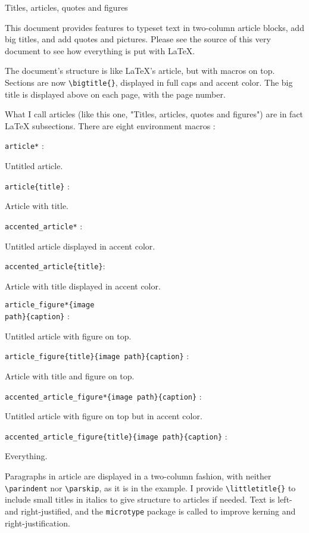 \documentclass[10pt]{article}
\begin{document}
\begin{article}{Titles, articles, quotes and figures}

\lettrine{T}{}his document provides features to typeset text in two-column article blocks, add big titles, and add quotes and pictures. Please see the source of this very document to see how everything is put with \LaTeX{}.


The document's structure is like \LaTeX's article, but with macros on top. Sections are now \texttt{\textbackslash bigtitle\{\}}, displayed in full caps and accent color. The big title is displayed above on each page, with the page number.

What I call articles (like this one, "Titles, articles, quotes and figures") are in fact \LaTeX{} subsections. There are eight environment macros :

\vskip 5pt \small \texttt{article*} : \normalsize

Untitled article.

\vskip 5pt \small \texttt{article\{title\}} : \normalsize

Article with title.

\vskip 5pt \small \texttt{accented\_article*} : \normalsize

Untitled article displayed in accent color.

\vskip 5pt \small \texttt{accented\_article\{title\}}: \normalsize

Article with title displayed in accent color.

\vskip 5pt \small \texttt{article\_figure*\{image\\path\}\{caption\}} : \normalsize

Untitled article with figure on top.

\vskip 5pt \small \texttt{article\_figure\{title\}\{image path\}\{caption\}} : \normalsize

Article with title and figure on top.

\vskip 5pt \small \texttt{accented\_article\_figure*\{image path\}\{caption\}} : \normalsize

Untitled article with figure on top but in accent color.

\vskip 5pt \small \texttt{accented\_article\_figure\{title\}\{image path\}\{caption\}} : \normalsize

Everything.


Paragraphs in article are displayed in a two-column fashion, with neither \texttt{\textbackslash parindent} nor \texttt{\textbackslash parskip}, as it is in the example. I provide \texttt{\textbackslash littletitle\{\}} to include small titles in italics to give structure to articles if needed. Text is left- and right-justified, and the \texttt{microtype} package is called to improve kerning and right-justification.


\end{article}
\end{document}
